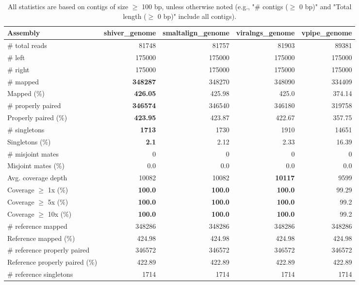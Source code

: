 \documentclass[12pt,a4paper]{article}
\begin{document}
\begin{table}[ht]
\begin{center}
\caption{All statistics are based on contigs of size $\geq$ 100 bp, unless otherwise noted (e.g., "\# contigs ($\geq$ 0 bp)" and "Total length ($\geq$ 0 bp)" include all contigs).}
\begin{tabular}{|l*{4}{|r}|}
\hline
Assembly & shiver\_genome & smaltalign\_genome & viralngs\_genome & vpipe\_genome \\ \hline
\# total reads & 81748 & 81757 & 81903 & 89381 \\ \hline
\# left & 175000 & 175000 & 175000 & 175000 \\ \hline
\# right & 175000 & 175000 & 175000 & 175000 \\ \hline
\# mapped & {\bf 348287} & 348270 & 348090 & 334409 \\ \hline
Mapped (\%) & {\bf 426.05} & 425.98 & 425.0 & 374.14 \\ \hline
\# properly paired & {\bf 346574} & 346540 & 346180 & 319758 \\ \hline
Properly paired (\%) & {\bf 423.95} & 423.87 & 422.67 & 357.75 \\ \hline
\# singletons & {\bf 1713} & 1730 & 1910 & 14651 \\ \hline
Singletons (\%) & {\bf 2.1} & 2.12 & 2.33 & 16.39 \\ \hline
\# misjoint mates & 0 & 0 & 0 & 0 \\ \hline
Misjoint mates (\%) & 0.0 & 0.0 & 0.0 & 0.0 \\ \hline
Avg. coverage depth & 10082 & 10082 & {\bf 10117} & 9599 \\ \hline
Coverage $\geq$ 1x (\%) & {\bf 100.0} & {\bf 100.0} & {\bf 100.0} & 99.29 \\ \hline
Coverage $\geq$ 5x (\%) & {\bf 100.0} & {\bf 100.0} & {\bf 100.0} & 99.2 \\ \hline
Coverage $\geq$ 10x (\%) & {\bf 100.0} & {\bf 100.0} & {\bf 100.0} & 99.2 \\ \hline
\# reference mapped & 348286 & 348286 & 348286 & 348286 \\ \hline
Reference mapped (\%) & 424.98 & 424.98 & 424.98 & 424.98 \\ \hline
\# reference properly paired & 346572 & 346572 & 346572 & 346572 \\ \hline
Reference properly paired (\%) & 422.89 & 422.89 & 422.89 & 422.89 \\ \hline
\# reference singletons & 1714 & 1714 & 1714 & 1714 \\ \hline

\end{tabular}
\end{center}
\end{table}
\end{document}
